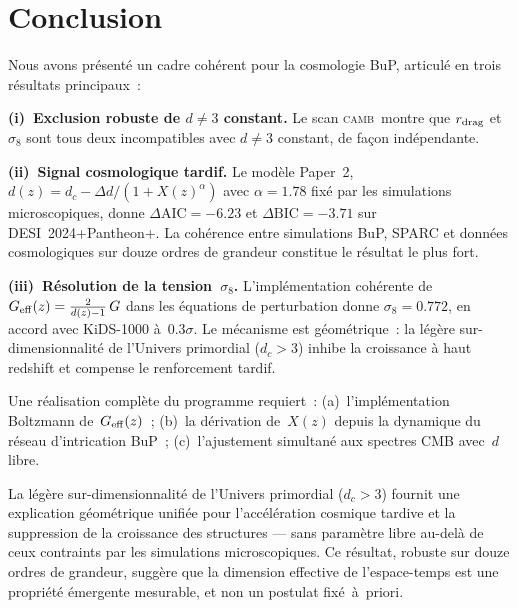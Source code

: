 \documentclass[a4paper,11pt]{article}
\newcommand{\DC}{d_c}
\newcommand{\Geff}{G_{\rm eff}}
\newcommand{\rdrag}{r_{\rm drag}}
\newcommand{\sig}{\sigma_8}
\newcommand{\camb}{\textsc{camb}}
\begin{document}
\section{Conclusion}
\label{sec:conclusion}

Nous avons présenté un cadre cohérent pour la cosmologie BuP,
articulé en trois résultats principaux~:

\textbf{(i)~Exclusion robuste de $d\neq 3$ constant.} Le scan \camb\
montre que $\rdrag$ et~$\sig$ sont tous deux incompatibles avec
$d\neq 3$ constant, de façon indépendante.

\textbf{(ii)~Signal cosmologique tardif.} Le modèle Paper~2,
$d(z)=\DC-\Delta d/(1+X(z)^\alpha)$ avec $\alpha=1.78$ fixé
par les simulations microscopiques, donne $\Delta\mathrm{AIC}=-6.23$
et $\Delta\mathrm{BIC}=-3.71$ sur DESI~2024+Pantheon+. La cohérence
entre simulations BuP, SPARC et données cosmologiques sur douze
ordres de grandeur constitue le résultat le plus fort.

\textbf{(iii)~Résolution de la tension~$\sig$.} L'implémentation
cohérente de $\Geff(z)=\frac{2}{d(z)-1}\,G$ dans les équations
de perturbation donne $\sig=0.772$, en accord avec KiDS-1000
à~$0.3\sigma$. Le mécanisme est géométrique~: la légère
sur-dimensionnalité de l'Univers primordial ($\DC>3$) inhibe
la croissance à haut redshift et compense le renforcement tardif.

Une réalisation complète du programme requiert~: (a)~l'implémentation
Boltzmann de~$\Geff(z)$~; (b)~la dérivation de~$X(z)$ depuis la
dynamique du réseau d'intrication BuP~; (c)~l'ajustement simultané
aux spectres CMB avec~$d$ libre.

La légère sur-dimensionnalité de l'Univers primordial ($\DC>3$) fournit
une explication géométrique unifiée pour l'accélération cosmique tardive
et la suppression de la croissance des structures --- sans paramètre libre
au-delà de ceux contraints par les simulations microscopiques.
Ce résultat, robuste sur douze ordres de grandeur, suggère que la dimension
effective de l'espace-temps est une propriété émergente mesurable, et non
un postulat fixé~à~priori.
\end{document}
